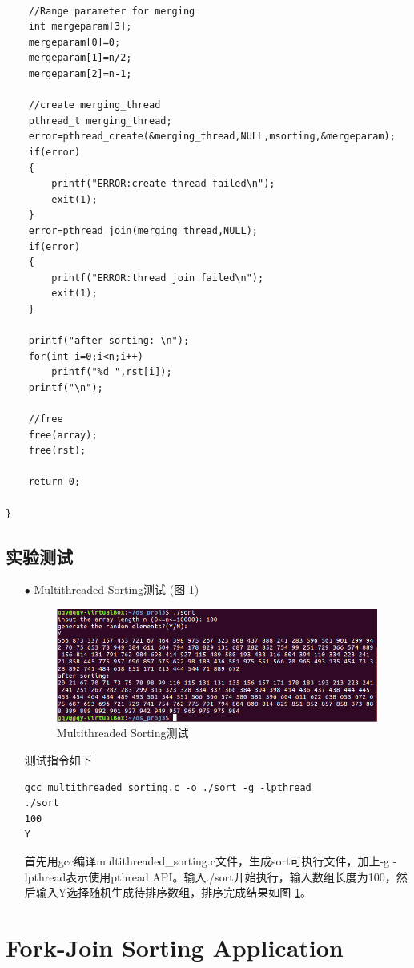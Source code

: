 \documentclass{article}
\begin{document}
\begin{lstlisting}[language={[ANSI]C}]
	
	//Range parameter for merging
	int mergeparam[3];
	mergeparam[0]=0;
	mergeparam[1]=n/2;
	mergeparam[2]=n-1;
	
	//create merging_thread
	pthread_t merging_thread;
	error=pthread_create(&merging_thread,NULL,msorting,&mergeparam);
	if(error)
	{
		printf("ERROR:create thread failed\n");
		exit(1);
	}
	error=pthread_join(merging_thread,NULL);
	if(error)
	{
		printf("ERROR:thread join failed\n");
		exit(1);
	}
	
	printf("after sorting: \n");
	for(int i=0;i<n;i++)
		printf("%d ",rst[i]);
	printf("\n");
	
	//free
	free(array);
	free(rst);
	
	return 0;
	
}
\end{lstlisting}
\subsection{实验测试}
\begin{itemize}
\item[$\bullet$]Multithreaded Sorting测试 (图 \ref{Multithreaded Sorting测试})
\begin{figure}[htbp]
		\centering
		\includegraphics{mult}
		\caption{Multithreaded Sorting测试} \label{Multithreaded Sorting测试}
\end{figure}

测试指令如下
\begin{lstlisting}[language={[ANSI]C}]
gcc multithreaded_sorting.c -o ./sort -g -lpthread
./sort
100
Y
\end{lstlisting}
首先用gcc编译multithreaded\_sorting.c文件，生成sort可执行文件，加上-g -lpthread表示使用pthread API。输入./sort开始执行，输入数组长度为100，然后输入Y选择随机生成待排序数组，排序完成结果如图 \ref{Multithreaded Sorting测试}。
\end{itemize}

\section{Fork-Join Sorting Application}
\end{document}
